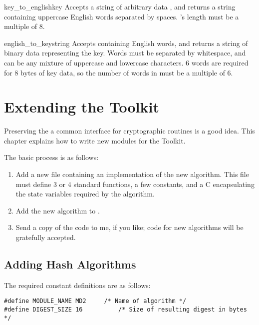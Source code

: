 \documentclass{howto}
\begin{document}
\begin{funcdesc}{key_to_english}{key}
Accepts a string of arbitrary data , and returns a string
containing uppercase English words separated by spaces.  's
length must be a multiple of 8.
\end{funcdesc}

\begin{funcdesc}{english_to_key}{string}
Accepts  containing English words, and returns a string of
binary data representing the key.  Words must be separated by
whitespace, and can be any mixture of uppercase and lowercase
characters.  6 words are required for 8 bytes of key data, so
the number of words in  must be a multiple of 6.
\end{funcdesc}


\section{Extending the Toolkit}

Preserving the a common interface for cryptographic routines is a good
idea.  This chapter explains how to write new modules for the Toolkit.

The basic process is as follows:
\begin{enumerate}

\item Add a new  file containing an implementation of the new
algorithm.  
This file must define 3 or 4 standard functions,
a few constants, and a C  encapsulating the state variables required by the algorithm.

\item  Add the new algorithm to .

\item  Send a copy of the code to me, if you like; code for new
algorithms will be gratefully accepted.
\end{enumerate}


\subsection{Adding Hash Algorithms}

The required constant definitions are as follows:

\begin{verbatim}
#define MODULE_NAME MD2		/* Name of algorithm */
#define DIGEST_SIZE 16          /* Size of resulting digest in bytes */
\end{verbatim}
\end{document}

